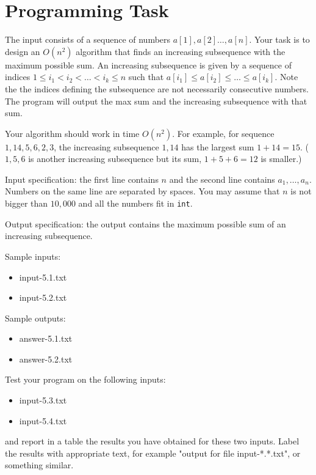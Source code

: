 \documentclass[11pt]{article}
\begin{document}
\section*{Programming Task}

The input consists of a sequence of numbers $a[1], a[2] \ldots, a[n]$. Your task is to design an $O(n^2)$ algorithm that finds an increasing subsequence with the maximum possible sum. An increasing subsequence is given by a sequence of indices $1 \le i_1 < i_2 < \ldots < i_k \le n$ such that $a[i_1] \le a[i_2] \le \ldots \le a[i_k]$. Note the the indices defining the subsequence are not necessarily consecutive numbers. The program will output the max sum and the increasing subsequence with that sum.

Your algorithm should work in time $O(n^2)$. For example, for sequence $1, 14, 5, 6, 2, 3$, the increasing subsequence $1, 14$ has the largest sum $1 + 14 = 15$. ($1, 5, 6$ is another increasing subsequence but its sum, $1 + 5 + 6 = 12$ is smaller.)

Input specification: the first line contains $n$ and the second line contains $a_1, \ldots, a_n$. Numbers on the same line are separated by spaces. You may assume that $n$ is not bigger than $10,000$ and all the numbers fit in \texttt{int}.

Output specification: the output contains the maximum possible sum of an increasing subsequence.

Sample inputs:
\begin{itemize}
\item input-5.1.txt
\item input-5.2.txt
\end{itemize}

Sample outputs:
\begin{itemize}
\item answer-5.1.txt
\item answer-5.2.txt
\end{itemize}

Test your program on the following inputs:
\begin{itemize}
\item input-5.3.txt
\item input-5.4.txt
\end{itemize}
and report in a table the results you have obtained for these two inputs. Label the results with appropriate text, for example "output for file input-*.*.txt", or something similar.
\end{document}
